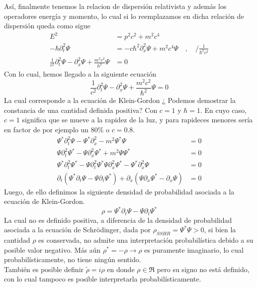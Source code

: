 \documentclass[../main.tex]{subfiles}
\begin{document}
Así, finalmente tenemos la relacion de dispersión relativista y además los operadores energía y momento, lo cual si lo reemplazamos en dicha relación de dispersión queda como sigue
\begin{align*}
E^2  & = p^2c^2 + m^2c^4 \\
  -\hbar \partial^2_t \Psi & = -c\hbar^2\partial^2_x \Psi + m^2c^4 \Psi \quad, \quad /\frac{1}{\hbar^2c^2}\\  
  \frac{1}{c^2}\partial_t^2\Psi - \partial^2_x \Psi  + \frac{m^2c^2}{h^2}\Psi &= 0
\end{align*}
Con lo cual, hemos llegado a la siguiente ecuación
\begin{equation}
  \boxed{\frac{1}{c^2}\partial^2_t\Psi - \partial^2_x\Psi + \frac{m^2c^2}{\hbar^2}\Psi = 0}
\end{equation}
La cual corresponde a la ecuación de Klein-Gordon ¿ Podemos demostrar la constancia de una cantidad definida positiva? Con $c= 1$ y $\hbar=1$. En cuyo caso, $c=1$ significa que se mueve a la rapidez de la luz, y para rapideces menores sería en factor de por ejemplo un 80$\%$ o $c=0.8$.  \\ 
\begin{align*}
  \Psi^*  \partial^2_t \Psi - \Psi^* \partial^2_x - m^2 \Psi^* \Psi  & = 0 \\
  \Psi \partial^2_t \Psi^* - \Psi \partial^2_x \Psi^* + m^2 \Psi \Psi^*  & = 0 \\ 
  \Psi^*\partial^2_t \Psi^* - \Psi \partial^2_t \Psi^* \Psi \partial^2_x \Psi^*- \Psi^*\partial^2_x \Psi & = 0 \\
  \partial_t \left( \Psi^*\partial_t\Psi - \Psi\partial_t\Psi^* \right) + \partial_x\left( \Psi\partial_x \Psi^* - \partial_x\Psi \right) & = 0
\end{align*}
Luego, de ello definimos la siguiente densidad de probabilidad asociada a la ecuación de Klein-Gordon.
\begin{equation}
  \rho = \Psi^*\partial_t\Psi - \Psi\partial_t\Psi^*
\end{equation}
La cual no es definido positiva, a diferencia de la densidad de probabilidad asociada a la ecuación de Schrödinger, dada por $\rho_{SSHR}= \Psi^*\Psi>0$, si bien la cantidad $\rho$ es conservada, no admite una interpretación probabilística debido a su posible valor negativo. Más aún $\rho^*=-\rho \rightarrow \rho$ es puramente imaginario, lo cual probabilísticamente, no tiene ningún sentido. \\
 También es posible definir $\tilde{\rho}=i\rho$ en donde $\rho\in\mathfrak{R}$ pero su signo no está definido, con lo cual tampoco es posible interpretarla probabilísticamente. \\
\end{document}
